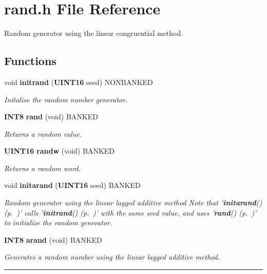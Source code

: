 \section{rand.h File Reference}
\label{rand.h}
Random generator using the linear congruential method. 


\subsection*{Functions}
\begin{CompactItemize}
\item 
void {\bf initrand} ({\bf UINT16} seed) NONBANKED
\begin{CompactList}\small\item\em Initalise the random number generator.\item\end{CompactList}

\item 
\label{rand.h_a1}
{\bf INT8} {\bf rand} (void) BANKED
\begin{CompactList}\small\item\em Returns a random value.\item\end{CompactList}

\item 
\label{rand.h_a2}
{\bf UINT16} {\bf randw} (void) BANKED
\begin{CompactList}\small\item\em Returns a random word.\item\end{CompactList}

\item 
void {\bf initarand} ({\bf UINT16} seed) BANKED
\begin{CompactList}\small\item\em Random generator using the linear lagged additive method Note that '{\bf initarand}() {\rm (p.~\pageref{rand.h_a3})}' calls '{\bf initrand}() {\rm (p.~\pageref{rand.h_a0})}' with the same seed value, and uses '{\bf rand}() {\rm (p.~\pageref{rand.h_a1})}' to initialize the random generator.\item\end{CompactList}

\item 
\label{rand.h_a4}
{\bf INT8} {\bf arand} (void) BANKED
\begin{CompactList}\small\item\em Generates a random number using the linear lagged additive method.\item\end{CompactList}

\end{CompactItemize}
\vspace{0.4cm}\hrule\vspace{0.2cm}
